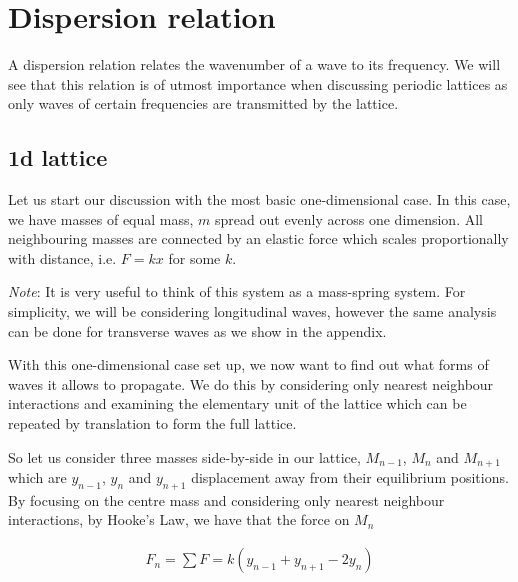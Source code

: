 \chapter{Dispersion relation}
\label{disperrel}
A dispersion relation relates the wavenumber of a wave to its frequency. We
will see that this relation is of utmost importance when discussing periodic
lattices as only waves of certain frequencies are transmitted by the lattice.

\section{1d lattice}
\begin{center}
\end{center}
Let us start our discussion with the most basic one-dimensional case. In this
case, we have masses of equal mass, $m$ spread out evenly across one dimension.
All neighbouring masses are connected by an elastic force which scales
proportionally with distance, i.e. $F = kx$ for some $k$.

\textit{Note}: It is very useful to think of this system as a mass-spring
system. For simplicity, we will be considering longitudinal waves, however the
same analysis can be done for transverse waves as we show in the appendix.

With this one-dimensional case set up, we now want to find out what forms of
waves it allows to propagate. We do this by considering only nearest neighbour
interactions and examining the elementary unit of the lattice which can be
repeated by translation to form the full lattice.

So let us consider three masses side-by-side in our lattice, $M_{n-1}$, $M_n$
and $M_{n+1}$ which are $y_{n-1}$, $y_n$ and $y_{n+1}$ displacement away from
their equilibrium positions. By focusing on the centre mass and considering
only nearest neighbour interactions, by Hooke's Law, we have that the force on
$M_n$

\begin{align}
  F_{n}=\sum F=k\left(y_{n-1}+y_{n+1}-2y_{n}\right) \label{eq:HL}
\end{align}

